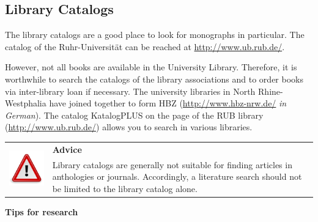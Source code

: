\documentclass[
  english,
]{scrreprt}
\newlength{\iconwidth}
\newenvironment{displaybox}[2]{%
    \begin{center}
        \setlength\arrayrulewidth{0.75pt}%
        \arrayrulecolor{white}%
        \renewcommand{\arraystretch}{1.3}%
        \begin{tabular}{p{\iconwidth}p{\linewidth-4\tabcolsep-\iconwidth}}
            \multirow{2}{*}{#2}&\cellcolor{boxheadcol}\textbf{\sffamily\color{white}#1} \\%
            \hhline{~-}%
            &\cellcolor{boxcol}%
}{%
            \\
        \end{tabular}
        \arrayrulecolor{black}
    \end{center}
}
\newenvironment{Advice}{%
\begin{displaybox}{Advice}{\includegraphics[width=\iconwidth]{images/icon-hinweis}}}%
{\end{displaybox}}
\begin{document}
\subsection{Library Catalogs}\label{library-catalogs}

The library catalogs are a good place to look for monographs in particular. The catalog of the Ruhr-Universität can be reached at \url{http://www.ub.rub.de/}.

However, not all books are available in the University Library. Therefore, it is worthwhile to search the catalogs of the library associations and to order books via inter-library loan if necessary. The university libraries in North Rhine-Westphalia have joined together to form HBZ (\url{http://www.hbz-nrw.de/} \emph{in German}). The catalog KatalogPLUS on the page of the RUB library (\url{http://www.ub.rub.de/}) allows you to search in various libraries.

\begin{Advice}

Library catalogs are generally not suitable for finding articles in anthologies or journals. Accordingly, a literature search should not be limited to the library catalog alone.

\end{Advice}

\textbf{Tips for research}
\end{document}
